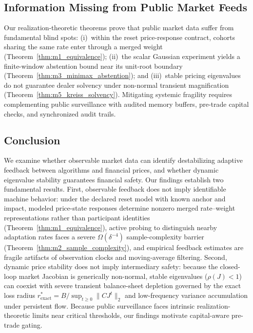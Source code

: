 \documentclass[12pt]{article}
\theoremstyle{definition}
\theoremstyle{remark}
\begin{document}
\subsection{Information Missing from Public Market Feeds}
\label{sec:missing_info}
Our realization-theoretic theorems prove that public market data suffer from fundamental blind spots: (i)~within the reset price-response contract, cohorts sharing the same rate enter through a merged weight (Theorem~\ref{thm:m1_equivalence}); (ii)~the scalar Gaussian experiment yields a finite-window abstention bound near its unit-root boundary (Theorem~\ref{thm:m3_minimax_abstention}); and (iii)~stable pricing eigenvalues do not guarantee dealer solvency under non-normal transient magnification (Theorem~\ref{thm:m5_kreiss_solvency}). Mitigating systemic fragility requires complementing public surveillance with audited memory buffers, pre-trade capital checks, and synchronized audit trails.

\subsection{Conclusion}
We examine whether observable market data can identify destabilizing adaptive feedback between algorithms and financial prices, and whether dynamic eigenvalue stability guarantees financial safety. Our findings establish two fundamental results. First, observable feedback does not imply identifiable machine behavior: under the declared reset model with known anchor and impact, modeled price-state responses determine nonzero merged rate--weight representations rather than participant identities (Theorem~\ref{thm:m1_equivalence}), active probing to distinguish nearby adaptation rates faces a severe $\Omega(\delta^{-4})$ sample-complexity barrier (Theorem~\ref{thm:m2_sample_complexity}), and empirical feedback estimates are fragile artifacts of observation clocks and moving-average filtering. Second, dynamic price stability does not imply intermediary safety: because the closed-loop market Jacobian is generically non-normal, stable eigenvalues ($\rho(J) < 1$) can coexist with severe transient balance-sheet depletion governed by the exact loss radius $r^*_{\text{exact}} = B / \sup_{t \ge 0} \|C J^t\|_2$ and low-frequency variance accumulation under persistent flow. Because public surveillance faces intrinsic realization-theoretic limits near critical thresholds, our findings motivate capital-aware pre-trade gating.
\end{document}
